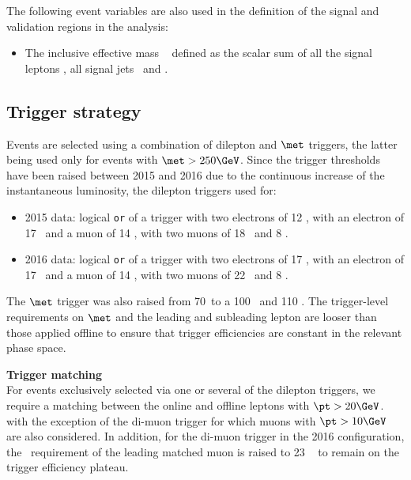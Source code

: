 The following event variables are also used in the definition of the signal and validation regions in the analysis:
\begin{itemize}
\item The inclusive effective mass \meff~ defined as the scalar sum of
  all the signal leptons \pt , all signal jets \pt\ and \met. 
\end{itemize}

\subsection{Trigger strategy}
\label{subsec:sec.strategy.sel.selection_trigger}
  
Events are selected using a combination of dilepton and $\met$ triggers, the latter being used only for events with $\met>250 \GeV$. 
Since the trigger thresholds have been raised between 2015 and 2016 due to the 
continuous increase of the instantaneous luminosity, 
the dilepton triggers used for: 
\begin{itemize}
\item 2015 data:
logical \texttt{or} of a trigger with two electrons of 12 \GeV, 
with an electron of 17 \GeV~and a muon of 14 \GeV,
with two muons of 18 \GeV~and 8 \GeV. 
\item 2016 data:
logical \texttt{or} of a trigger with two electrons of 17 \GeV, 
with an electron of 17 \GeV~and a muon of 14 \GeV,
with two muons of 22 \GeV~and 8 \GeV. 
\end{itemize}
The $\met$ trigger was also raised from 70\GeV~to a 100 \GeV~and 110 \GeV.
The trigger-level requirements on $\met$ and the leading and subleading lepton \pt are looser than those applied offline 
to ensure that trigger efficiencies are constant in the relevant phase space.


\par{\bfseries Trigger matching\\}
For events exclusively selected via one or several of the dilepton triggers, 
we require a matching between the online and offline leptons with $\pt>20 \GeV$.
with the exception of the di-muon trigger for which muons with $\pt>10 \GeV$ 
are also considered.
In addition, for the di-muon trigger in the 2016 configuration, 
the \pt\ requirement of the leading matched muon is raised to 23 \GeV~
to remain on the trigger efficiency plateau. 

